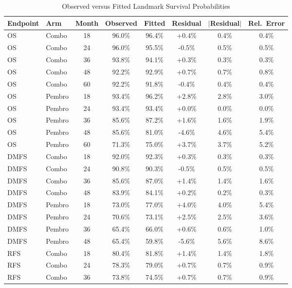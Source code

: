 \documentclass[11pt,a4paper]{article}
\begin{document}
\begin{table}[H]
\centering
\caption{Observed versus Fitted Landmark Survival Probabilities}
\label{tab:s15}
\small
\begin{tabular}{llcccccc}
\toprule
\textbf{Endpoint} & \textbf{Arm} & \textbf{Month} & \textbf{Observed} & \textbf{Fitted} & \textbf{Residual} & \textbf{$|$Residual$|$} & \textbf{Rel.\ Error} \\
\midrule
OS & Combo & 18 & 96.0\% & 96.4\% & +0.4\% & 0.4\% & 0.4\% \\
OS & Combo & 24 & 96.0\% & 95.5\% & -0.5\% & 0.5\% & 0.5\% \\
OS & Combo & 36 & 93.8\% & 94.1\% & +0.3\% & 0.3\% & 0.3\% \\
OS & Combo & 48 & 92.2\% & 92.9\% & +0.7\% & 0.7\% & 0.8\% \\
OS & Combo & 60 & 92.2\% & 91.8\% & -0.4\% & 0.4\% & 0.4\% \\
OS & Pembro & 18 & 93.4\% & 96.2\% & +2.8\% & 2.8\% & 3.0\% \\
OS & Pembro & 24 & 93.4\% & 93.4\% & +0.0\% & 0.0\% & 0.0\% \\
OS & Pembro & 36 & 85.6\% & 87.2\% & +1.6\% & 1.6\% & 1.9\% \\
OS & Pembro & 48 & 85.6\% & 81.0\% & -4.6\% & 4.6\% & 5.4\% \\
OS & Pembro & 60 & 71.3\% & 75.0\% & +3.7\% & 3.7\% & 5.2\% \\
DMFS & Combo & 18 & 92.0\% & 92.3\% & +0.3\% & 0.3\% & 0.3\% \\
DMFS & Combo & 24 & 90.8\% & 90.3\% & -0.5\% & 0.5\% & 0.5\% \\
DMFS & Combo & 36 & 85.6\% & 87.0\% & +1.4\% & 1.4\% & 1.6\% \\
DMFS & Combo & 48 & 83.9\% & 84.1\% & +0.2\% & 0.2\% & 0.3\% \\
DMFS & Pembro & 18 & 73.0\% & 77.0\% & +4.0\% & 4.0\% & 5.4\% \\
DMFS & Pembro & 24 & 70.6\% & 73.1\% & +2.5\% & 2.5\% & 3.6\% \\
DMFS & Pembro & 36 & 65.4\% & 66.0\% & +0.6\% & 0.6\% & 1.0\% \\
DMFS & Pembro & 48 & 65.4\% & 59.8\% & -5.6\% & 5.6\% & 8.6\% \\
RFS & Combo & 18 & 80.4\% & 81.8\% & +1.4\% & 1.4\% & 1.8\% \\
RFS & Combo & 24 & 78.3\% & 79.0\% & +0.7\% & 0.7\% & 0.9\% \\
RFS & Combo & 36 & 73.8\% & 74.5\% & +0.7\% & 0.7\% & 0.9\% \\

\end{tabular}
\end{table}
\end{document}
